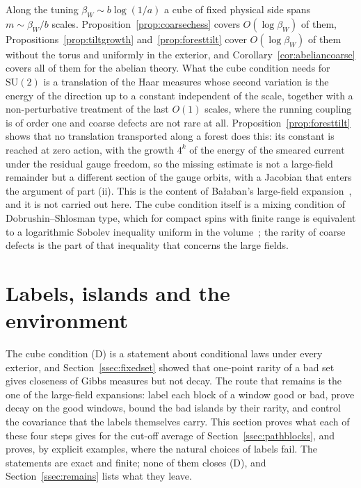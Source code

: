 \documentclass[11pt]{amsart}
\theoremstyle{definition}
\theoremstyle{remark}
\numberwithin{equation}{section}
\newcommand{\SU}{\mathrm{SU}}
\begin{document}
Along the tuning $\beta_W\sim b\log(1/a)$ a cube of fixed physical side
spans $m\sim\beta_W/b$ scales. Proposition~\ref{prop:coarsechess} covers
$O(\log\beta_W)$ of them, Propositions~\ref{prop:tiltgrowth}
and~\ref{prop:foresttilt} cover $O(\log\beta_W)$ of them without the torus
and uniformly in the exterior,
and Corollary~\ref{cor:abeliancoarse} covers all of them for the abelian
theory. What the cube condition needs for $\SU(2)$ is a translation of the
Haar measures whose second variation is the energy of the direction up to
a constant independent of the scale, together with a non-perturbative
treatment of the last $O(1)$ scales, where the running coupling is of order
one and coarse defects are not rare at all. Proposition~\ref{prop:foresttilt}
shows that no translation transported along a forest does this: its
constant is reached at zero action, with the growth $4^k$ of the energy of
the smeared current under the residual gauge freedom, so the missing
estimate is not a large-field remainder but a different section of the
gauge orbits, with a Jacobian that enters the argument of part (ii). This
is the content of Ba{\l}aban's large-field expansion~\cite{Bal89b}, and it
is not carried out here. The cube condition itself is a mixing condition
of Dobrushin--Shlosman type, which for compact spins with finite range is
equivalent to a logarithmic Sobolev inequality uniform in the
volume~\cite{SZ92}; the rarity of coarse defects is the part of that
inequality that concerns the large fields.

\section{Labels, islands and the environment}\label{sec:islands}

The cube condition (D) is a statement about conditional laws under every
exterior, and Section~\ref{ssec:fixedset} showed that one-point rarity of a
bad set gives closeness of Gibbs measures but not decay. The route that
remains is the one of the large-field expansions: label each block of a
window good or bad, prove decay on the good windows, bound the bad islands
by their rarity, and control the covariance that the labels themselves
carry. This section proves what each of these four steps gives for the
cut-off average of Section~\ref{ssec:pathblocks}, and proves, by explicit
examples, where the natural choices of labels fail. The statements are
exact and finite; none of them closes (D), and
Section~\ref{ssec:remains} lists what they leave.
\end{document}
